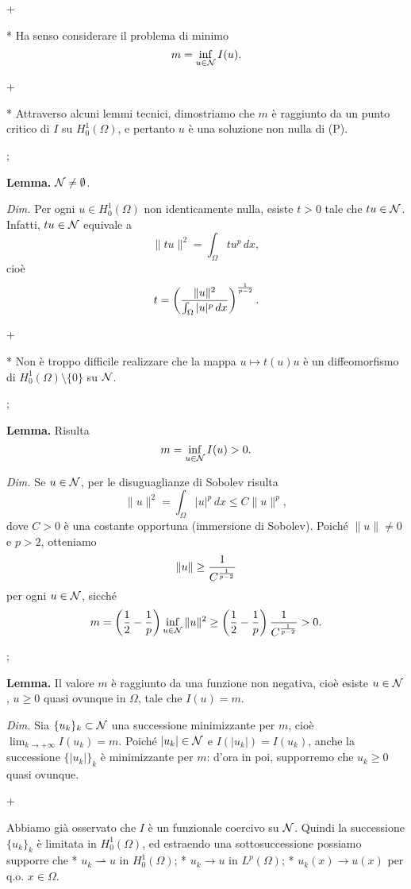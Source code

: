 \pg+

* Ha senso considerare il problema di minimo
$$
m = \inf_{u \in {\cal N}} I(u).
$$

\pg+

* Attraverso alcuni lemmi tecnici, dimostriamo che $m$ \`e raggiunto
  da un punto critico di $I$ su $H_0^1(\Omega)$, e pertanto $u$ \`e
  una soluzione non nulla di (P).

\pg;

{\bf Lemma.} ${\cal N} \neq \emptyset$.

{\em Dim.} Per ogni $u \in H_0^1(\Omega)$ non identicamente nulla,
esiste $t>0$ tale che $tu \in {\cal N}$. Infatti, $tu \in {\cal N}$
equivale a
$$
\|tu\|^2 = \int_\Omega {tu}^p \, dx,
$$
cio\`e
$$
t = \left( \frac{\|u\|^2}{\int_\Omega |u|^p \, dx} \right)^{{1 \over
p-2}}.
$$

\pg+

* Non \`e troppo difficile realizzare che la mappa $u \mapsto t(u)u$
  \`e un diffeomorfismo di $H_0^1(\Omega) \setminus \{0\}$ su ${\cal
  N}$.

\pg;

{\bf Lemma.} Risulta
$$
m = \inf_{u \in {\cal N}} I(u) > 0.
$$

{\em Dim.} Se $u \in {\cal N}$, per le disuguaglianze di Sobolev
risulta
$$
\|u\|^2 = \int_\Omega |u|^p \, dx \leq C \|u\|^p,
$$
dove $C>0$ \`e una costante opportuna (immersione di
Sobolev). Poich\'e $\|u\| \neq 0$ e $p>2$, otteniamo
$$
\|u\| \geq {1 \over C^{{1 \over p-2}}}
$$
per ogni $u \in {\cal N}$, sicch\'e
$$
m = \left( \frac12 - \frac1p \right) \inf_{u \in {\cal N}} \|u\|^2
\geq \left( \frac12 - \frac1p \right) {1 \over C^{{1 \over p-2}}} >0.
$$

\pg;

{\bf Lemma.} Il valore $m$ \`e raggiunto da una funzione non negativa,
cio\`e esiste $u \in {\cal N}$, $u \geq 0$ quasi ovunque in $\Omega$,
tale che $I(u)=m$.

{\em Dim.} Sia $\{u_k\}_k \subset {\cal N}$ una successione
minimizzante per $m$, cio\`e $\lim_{k \to +\infty} I(u_k) =
m$. Poich\'e $|u_k| \in {\cal N}$ e $I(|u_k|) = I(u_k)$, anche la
successione $\{|u_k|\}_k$ \`e minimizzante per $m$: d'ora in poi,
supporremo che $u_k \geq 0$ quasi ovunque.

\pg+

Abbiamo gi\`a osservato che $I$ \`e un funzionale coercivo su ${\cal
N}$. Quindi la successione $\{u_k\}_k$ \`e limitata in
$H_0^1(\Omega)$, ed estraendo una sottosuccessione possiamo supporre
che
\begitems
* $u_k \rightharpoonup u$ in $H_0^1(\Omega)$;
* $u_k \to u$ in $L^p(\Omega)$;
* $u_k(x) \to u(x)$ per q.o. $x \in \Omega$.
\enditems

